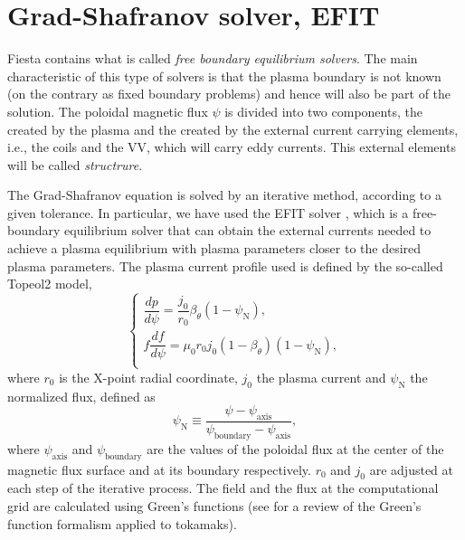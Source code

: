 \documentclass[a4paper,12pt,oneside]{book}
\begin{document}
\section{Grad-Shafranov solver, EFIT}

Fiesta contains what is called \textit{free boundary equilibrium solvers}. The main characteristic of this type of solvers is that the plasma boundary is not known (on the contrary as fixed boundary problems) and hence will also be part of the solution. The poloidal magnetic flux $\psi$ is divided into two components, the  created by the plasma and the created by the external current carrying elements, i.e., the coils and the VV, which will carry eddy currents. This external elements will be called \textit{structrure}.

The Grad-Shafranov equation is solved by an iterative method, according to a given tolerance. In particular, we have used the EFIT solver \cite{Lao_1985}, which is a free-boundary equilibrium solver that can obtain the external currents needed to achieve a plasma equilibrium with plasma parameters closer to the desired plasma parameters. The plasma current profile used is defined by the so-called Topeol2 model,
%
\begin{equation}\label{ec_topeol2}
\left\{
\begin{array}{c}
\dfrac{d p}{d \psi}=\dfrac{j_0}{r_0}\beta_\theta (1-\psi_\text{N}), \\
f \dfrac{d f}{d \psi}=\mu_0 r_0 j_0(1-\beta_\theta)(1-\psi_\text{N}), \\

\end{array}
\right.
\end{equation}
where  %
 $r_0$ is the X-point radial coordinate, $j_0$ the plasma current and $\psi_\text{N}$ the normalized flux, defined as
 \begin{equation}\label{ec_psiN}
\psi_\text{N} \equiv \dfrac{\psi - \psi_\text{axis}}{\psi_\text{boundary}-\psi_\text{axis}}, 
\end{equation}
%
where $\psi_\text{axis}$ and $\psi_\text{boundary}$ are the values of the poloidal flux at the center of the magnetic flux surface and at its boundary respectively. $r_0$ and $j_0$ are adjusted at each step of the iterative process. The field and the flux at the computational grid are calculated using Green's functions (see \cite{TokamakControl} for a review of the Green's function formalism applied to tokamaks).
 
\end{document}

